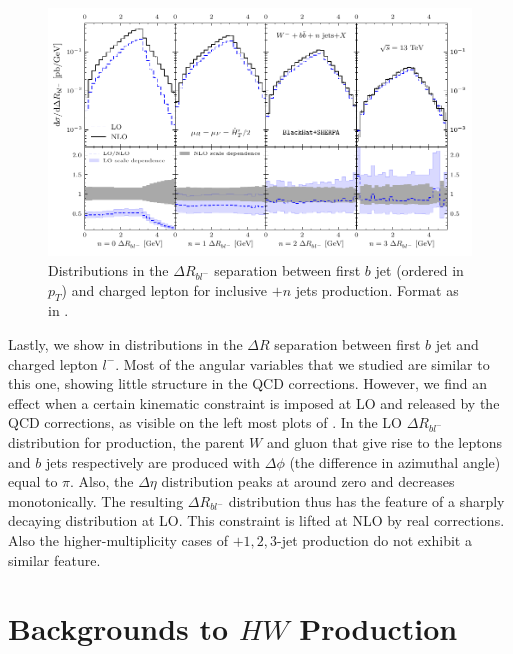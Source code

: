 \begin{figure}[ht]
\centering
\includegraphics[clip,scale=1.0]{plots/drbl.pdf}
  \caption{Distributions in the $\Delta R_{bl^-}$ separation between first
    $b$ jet (ordered in $p_T$) and charged lepton for inclusive \Wbbm$+n$ jets
    production. Format as in .}
  \label{fig_Wmnjdrbl}
\end{figure}


Lastly, we show in  distributions
in the $\Delta R$ separation between first $b$ jet and charged
lepton $l^-$. Most of the angular variables that we studied are
similar to this one, showing little structure in the QCD corrections. However, we find an effect when a certain kinematic constraint is
imposed at LO and released by the QCD corrections, as visible on the left most plots of . In the LO $\Delta R_{bl^-}$ distribution for \Wbbm{} production, the parent $W$
and gluon that give rise to the leptons and $b$ jets respectively are produced with $\Delta
\phi$ (the difference in azimuthal angle) equal to $\pi$. Also, the $\Delta \eta$
distribution peaks at around zero and decreases monotonically. The
resulting $\Delta R_{bl^-}$ distribution thus has the feature of a
sharply decaying distribution at LO. This constraint is lifted at NLO by real corrections. Also the higher-multiplicity cases of \Wbb$+1,2,3$-jet production do not exhibit a similar feature.

\section{Backgrounds to $HW$ Production}
\label{sec:hw}

